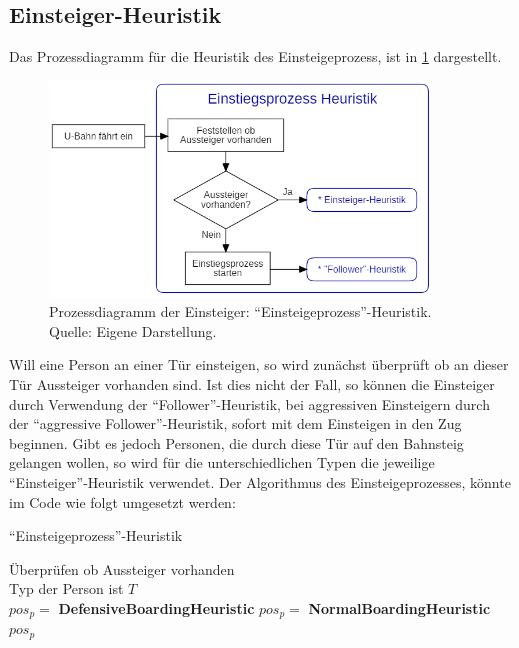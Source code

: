 \subsection{Einsteiger-Heuristik} \label{EM}
Das Prozessdiagramm für die Heuristik des Einsteigeprozess, ist in \figurename \ref{fig:EH} dargestellt. 
\begin{figure}[H]
	\centering
		\includegraphics[width=0.9\textwidth]{pictures/model/algorithm/boarding/boarding_process.png}
	\caption{Prozessdiagramm der Einsteiger: "`Einsteigeprozess"'-Heuristik. Quelle: Eigene Darstellung.}
	\label{fig:EH}
\end{figure}
Will eine Person an einer Tür einsteigen, so wird zunächst überprüft ob an dieser Tür Aussteiger vorhanden sind. Ist dies nicht der Fall, so können die Einsteiger durch Verwendung der "`Follower"'-Heuristik, bei aggressiven Einsteigern durch der "`aggressive Follower"'-Heuristik, sofort mit dem Einsteigen in den Zug beginnen. Gibt es jedoch Personen, die durch diese Tür auf den Bahnsteig gelangen wollen, so wird für die unterschiedlichen Typen die jeweilige "`Einsteiger"'-Heuristik verwendet. Der Algorithmus des Einsteigeprozesses, könnte im Code wie folgt umgesetzt werden:

\begin{algorithm} [H]
	\caption{"`Einsteigeprozess"'-Heuristik}
	
	\BoardingHeuristic{} {
		Überprüfen ob Aussteiger vorhanden \\
		Typ der Person ist $T$\\
		 {
			 { 
				$pos_p = $ \textbf{DefensiveBoardingHeuristic}
			} {
				$pos_p = $ \textbf{NormalBoardingHeuristic} 	
			} 
		} 
		\Return $pos_p$
	}
\end{algorithm}

